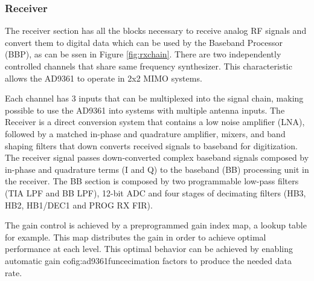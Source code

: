 \subsubsection{Receiver}

The receiver section has all the blocks necessary to receive analog RF signals
and convert them to digital data which can be used by the Baseband Processor
(BBP), as can be ssen in Figure \ref{fig:rxchain}. There are two independently
controlled channels that share same frequency synthesizer. This characteristic
allows the AD9361 to operate in  2x2 MIMO systems.

Each channel has 3 inputs that can be multiplexed into the signal chain, making
possible to use the AD9361 into systems with multiple antenna inputs. The
Receiver is a direct conversion system that contains a low noise amplifier
(LNA), followed by a matched in-phase and quadrature amplifier, mixers, and band
shaping filters that down converts received signals to baseband for
digitization. The
receiver signal passes down-converted complex baseband signals composed by
in-phase and quadrature terms (I and Q) to the baseband (BB) processing unit in
the receiver. The BB section is composed by two programmable low-pass filters
(TIA LPF and BB LPF), 12-bit ADC and four stages of decimating filters (HB3,
HB2, HB1/DEC1 and PROG RX FIR).

The gain control is achieved by a preprogrammed gain index map, a lookup table
for example. This map distributes the gain in order to achieve optimal
performance at each level. This optimal behavior can be achieved by enabling
automatic gain cofig:ad9361funcecimation factors to produce the needed data rate.



